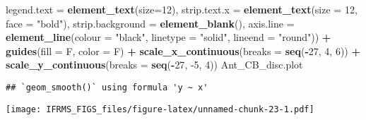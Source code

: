 \documentclass[
]{article}
\newenvironment{Shaded}{\begin{snugshade}}{\end{snugshade}}
\newcommand{\DataTypeTok}[1]{\textcolor[rgb]{0.13,0.29,0.53}{#1}}
\newcommand{\DecValTok}[1]{\textcolor[rgb]{0.00,0.00,0.81}{#1}}
\newcommand{\KeywordTok}[1]{\textcolor[rgb]{0.13,0.29,0.53}{\textbf{#1}}}
\newcommand{\NormalTok}[1]{#1}
\newcommand{\OperatorTok}[1]{\textcolor[rgb]{0.81,0.36,0.00}{\textbf{#1}}}
\newcommand{\StringTok}[1]{\textcolor[rgb]{0.31,0.60,0.02}{#1}}
\begin{document}
\begin{Shaded}
\begin{Highlighting}[]
         \DataTypeTok{legend.text =} \KeywordTok{element_text}\NormalTok{(}\DataTypeTok{size=}\DecValTok{12}\NormalTok{),}
         \DataTypeTok{strip.text.x =} \KeywordTok{element_text}\NormalTok{(}\DataTypeTok{size =} \DecValTok{12}\NormalTok{,  }\DataTypeTok{face =} \StringTok{"bold"}\NormalTok{),}
         \DataTypeTok{strip.background =} \KeywordTok{element_blank}\NormalTok{(),}
         \DataTypeTok{axis.line =} \KeywordTok{element_line}\NormalTok{(}\DataTypeTok{colour =} \StringTok{"black"}\NormalTok{, }\DataTypeTok{linetype =} \StringTok{"solid"}\NormalTok{, }\DataTypeTok{lineend =} \StringTok{"round"}\NormalTok{)) }\OperatorTok{+}
\StringTok{   }\KeywordTok{guides}\NormalTok{(}\DataTypeTok{fill =}\NormalTok{ F, }\DataTypeTok{color =}\NormalTok{ F) }\OperatorTok{+}\StringTok{ }
\StringTok{   }\KeywordTok{scale_x_continuous}\NormalTok{(}\DataTypeTok{breaks =} \KeywordTok{seq}\NormalTok{(}\OperatorTok{-}\DecValTok{27}\NormalTok{, }\DecValTok{4}\NormalTok{, }\DecValTok{6}\NormalTok{)) }\OperatorTok{+}\StringTok{ }
\StringTok{   }\KeywordTok{scale_y_continuous}\NormalTok{(}\DataTypeTok{breaks =} \KeywordTok{seq}\NormalTok{(}\OperatorTok{-}\DecValTok{27}\NormalTok{, }\DecValTok{-5}\NormalTok{, }\DecValTok{4}\NormalTok{))}
\NormalTok{Ant_CB_disc.plot}
\end{Highlighting}
\end{Shaded}

\begin{verbatim}
## `geom_smooth()` using formula 'y ~ x'
\end{verbatim}

\texttt{[image: IFRMS\_FIGS\_files/figure-latex/unnamed-chunk-23-1.pdf]}
\end{document}

